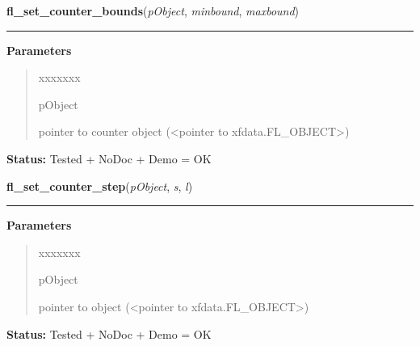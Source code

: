 \hspace{.8\funcindent}\begin{boxedminipage}{\funcwidth}

    \raggedright \textbf{fl\_set\_counter\_bounds}(\textit{pObject}, \textit{minbound}, \textit{maxbound})

    \vspace{-1.5ex}

    \rule{\textwidth}{0.5\fboxrule}
\setlength{\parskip}{2ex}
\setlength{\parskip}{1ex}
      \textbf{Parameters}
      \vspace{-1ex}

      \begin{quote}
        \begin{Ventry}{xxxxxxx}

          \item[pObject]

          pointer to counter object ({\textless}pointer to 
          xfdata.FL\_OBJECT{\textgreater})

        \end{Ventry}

      \end{quote}

\textbf{Status:} Tested + NoDoc + Demo = OK



    \end{boxedminipage}

    \label{xformslib:library:fl_set_counter_step}

    \vspace{0.5ex}

\hspace{.8\funcindent}\begin{boxedminipage}{\funcwidth}

    \raggedright \textbf{fl\_set\_counter\_step}(\textit{pObject}, \textit{s}, \textit{l})

    \vspace{-1.5ex}

    \rule{\textwidth}{0.5\fboxrule}
\setlength{\parskip}{2ex}
\setlength{\parskip}{1ex}
      \textbf{Parameters}
      \vspace{-1ex}

      \begin{quote}
        \begin{Ventry}{xxxxxxx}

          \item[pObject]

          pointer to object ({\textless}pointer to 
          xfdata.FL\_OBJECT{\textgreater})

        \end{Ventry}

      \end{quote}

\textbf{Status:} Tested + NoDoc + Demo = OK



    \end{boxedminipage}

